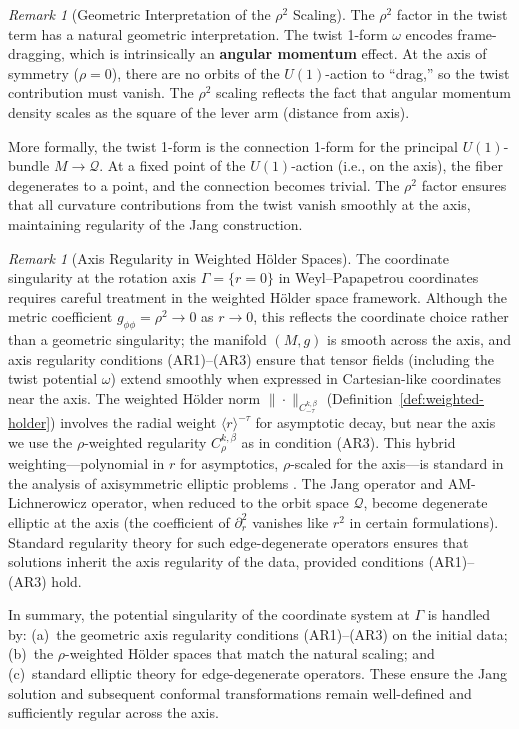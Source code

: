 \documentclass[12pt]{article}
\theoremstyle{plain}
\theoremstyle{definition}
\theoremstyle{remark}
\newtheorem{remark}[theorem]{Remark}
\newcommand{\Hoelder}{\beta}
\begin{document}
\begin{remark}[Geometric Interpretation of the $\rho^2$ Scaling]\label{rem:rho-squared-geometric}
The $\rho^2$ factor in the twist term has a natural geometric interpretation. The twist 1-form $\omega$ encodes frame-dragging, which is intrinsically an \textbf{angular momentum} effect. At the axis of symmetry ($\rho = 0$), there are no orbits of the $U(1)$-action to ``drag,'' so the twist contribution must vanish. The $\rho^2$ scaling reflects the fact that angular momentum density scales as the square of the lever arm (distance from axis).

More formally, the twist 1-form is the connection 1-form for the principal $U(1)$-bundle $M \to \mathcal{Q}$. At a fixed point of the $U(1)$-action (i.e., on the axis), the fiber degenerates to a point, and the connection becomes trivial. The $\rho^2$ factor ensures that all curvature contributions from the twist vanish smoothly at the axis, maintaining regularity of the Jang construction.
\end{remark}

\begin{remark}[Axis Regularity in Weighted H\"older Spaces]\label{rem:axis-weighted-holder}
The coordinate singularity at the rotation axis $\Gamma = \{r = 0\}$ in Weyl--Papapetrou coordinates requires careful treatment in the weighted H\"older space framework. Although the metric coefficient $g_{\phi\phi} = \rho^2 \to 0$ as $r \to 0$, this reflects the coordinate choice rather than a geometric singularity; the manifold $(M, g)$ is smooth across the axis, and axis regularity conditions (AR1)--(AR3) ensure that tensor fields (including the twist potential $\omega$) extend smoothly when expressed in Cartesian-like coordinates near the axis. The weighted H\"older norm $\|\cdot\|_{C^{k,\Hoelder}_{-\tau}}$ (Definition~\ref{def:weighted-holder}) involves the radial weight $\langle r \rangle^{-\tau}$ for asymptotic decay, but near the axis we use the $\rho$-weighted regularity $C^{k,\Hoelder}_\rho$ as in condition (AR3). This hybrid weighting---polynomial in $r$ for asymptotics, $\rho$-scaled for the axis---is standard in the analysis of axisymmetric elliptic problems \cite{chruscielwald1994, dainortiz2009}. The Jang operator and AM-Lichnerowicz operator, when reduced to the orbit space $\mathcal{Q}$, become degenerate elliptic at the axis (the coefficient of $\partial_r^2$ vanishes like $r^2$ in certain formulations). Standard regularity theory \cite{mazzeo1991} for such edge-degenerate operators ensures that solutions inherit the axis regularity of the data, provided conditions (AR1)--(AR3) hold.

In summary, the potential singularity of the coordinate system at $\Gamma$ is handled by: (a)~the geometric axis regularity conditions (AR1)--(AR3) on the initial data; (b)~the $\rho$-weighted H\"older spaces that match the natural scaling; and (c)~standard elliptic theory for edge-degenerate operators. These ensure the Jang solution and subsequent conformal transformations remain well-defined and sufficiently regular across the axis.
\end{remark}
\end{document}
